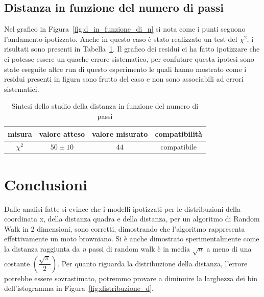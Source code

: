 \documentclass[a4paper,12pt]{article}
\begin{document}
\subsection{Distanza in funzione del numero di passi}

Nel grafico in Figura~\ref{fig:d_in_funzione_di_n} si nota come i punti seguono l'andamento ipotizzato. Anche in questo caso è stato realizzato un test del $\chi^2$, i risultati sono presenti in Tabella~\ref{tab:sintesi_d_funz_n}.
Il grafico dei residui ci ha fatto ipotizzare che ci potesse essere un quache errore sistematico, per confutare questa ipotesi sono state eseguite altre run di questo esperimento le quali hanno mostrato come i residui presenti in figura sono frutto del caso e non sono associabili ad errori sistematici.

\begin{table}[h!]
    \centering
    \begin{tabular}{c|c|c|c}
        \toprule
        misura   & valore atteso & valore misurato  & compatibilità \\
        \midrule
        $\chi^2$ & $50 \pm 10$   & $44$             & compatibile   \\
        \bottomrule
    \end{tabular}
    \caption{Sintesi dello studio della distanza in funzione del numero di passi}%
    \label{tab:sintesi_d_funz_n}
\end{table}

\section{Conclusioni}

Dalle analisi fatte si evince che i modelli ipotizzati per le distribuzioni della coordinata x, della distanza quadra e della distanza, per un algoritmo di Random Walk in 2 dimensioni, sono corretti, dimostrando che l'algoritmo rappresenta effettivamente un moto browniano. Si è anche dimostrato sperimentalmente come la distanza raggiunta da \textit{n} passi di random walk è in media $\sqrt{n}$ a meno di una costante $(\dfrac{\sqrt{\pi}}{2})$. 
Per quanto riguarda la distribuzione della distanza, l'errore potrebbe essere sovrastimato, potremmo provare a diminuire la larghezza dei bin dell'istogramma in Figura~\ref{fig:distribuzione_d}.
\end{document}
